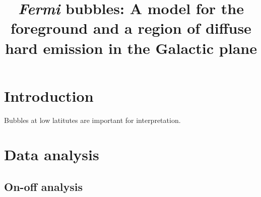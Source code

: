\documentclass[a4paper]{article}
\newcommand{\Fermi}{\textit{Fermi} }
\begin{document}
\title{\Fermi bubbles: A model for the foreground and a region of diffuse hard emission in the Galactic plane}
\maketitle

\section{Introduction}
Bubbles at low latitutes are important for interpretation.




\section{Data analysis}

\subsection{On-off analysis}
\end{document}

